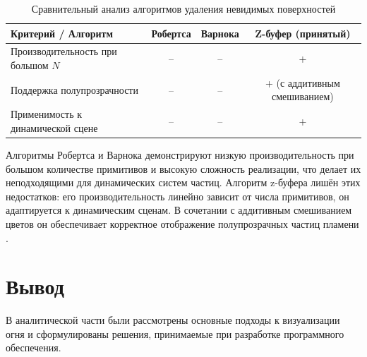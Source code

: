 \begin{table}[H]
	\centering
	\small
	\caption{Сравнительный анализ алгоритмов удаления невидимых поверхностей}
	\begin{tabular}{|p{4.5cm}|c|c|c|}
		\hline
		\textbf{Критерий / Алгоритм} & \textbf{Робертса} & \textbf{Варнока} & \textbf{Z-буфер (принятый)} \\
		\hline
		Производительность при большом $N$ & -- & -- & + \\
		\hline
		Поддержка полупрозрачности & -- & -- & + (с аддитивным смешиванием) \\
		\hline
		Применимость к динамической сцене & -- & -- & + \\
		\hline
	\end{tabular}
	\label{tab:hidden_surface_comparison}
\end{table}

Алгоритмы Робертса и Варнока демонстрируют низкую производительность при большом количестве примитивов и высокую сложность реализации, что делает их неподходящими для динамических систем частиц. Алгоритм z-буфера лишён этих недостатков: его производительность линейно зависит от числа примитивов, он адаптируется к динамическим сценам. В сочетании с аддитивным смешиванием цветов он обеспечивает корректное отображение полупрозрачных частиц пламени \cite{VolumeRendering}.

\section{Вывод}

В аналитической части были рассмотрены основные подходы к визуализации огня и сформулированы решения, принимаемые при разработке программного обеспечения.

\clearpage
